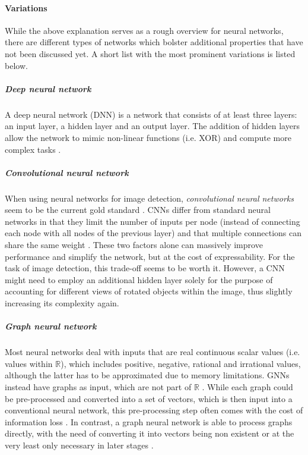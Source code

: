 \documentclass[draft,final]{vutinfth} %
\begin{document}
\paragraph{Variations} While the above explanation serves as a rough overview for neural networks, there are different types of networks which bolster additional properties that have not been discussed yet. A short list with the most prominent variations is listed below.

\subparagraph{Deep neural network} A deep neural network (DNN) is a network that consists of at least three layers: an input layer, a hidden layer and an output layer. The addition of hidden layers allow the network to mimic non-linear functions (i.e. XOR) and compute more complex tasks \cite{borisov2022deep}.

\subparagraph{Convolutional neural network} When using neural networks for image detection, \emph{convolutional neural networks} seem to be the current gold standard \cite{li2021survey}. CNNs differ from standard neural networks in that they limit the number of inputs per node (instead of connecting each node with all nodes of the previous layer) and that multiple connections can share the same weight \cite{li2021survey}. These two factors alone can massively improve performance and simplify the network, but at the cost of expressability. For the task of image detection, this trade-off seems to be worth it. However, a CNN might need to employ an additional hidden layer solely for the purpose of accounting for different views of rotated objects within the image, thus slightly increasing its complexity again.

\subparagraph{Graph neural network} Most neural networks deal with inputs that are real continuous scalar values (i.e. values within $\mathbb{R}$), which includes positive, negative, rational and irrational values, although the latter has to be approximated due to memory limitations. GNNs instead have graphs as input, which are not part of $\mathbb{R}$ \cite{scarselli2008graph}. While each graph could be pre-processed and converted into a set of vectors, which is then input into a conventional neural network, this pre-processing step often comes with the cost of information loss \cite{scarselli2008graph}. In contrast, a graph neural network is able to process graphs directly, with the need of converting it into vectors being non existent or at the very least only necessary in later stages \cite{scarselli2008graph}.
\end{document}
